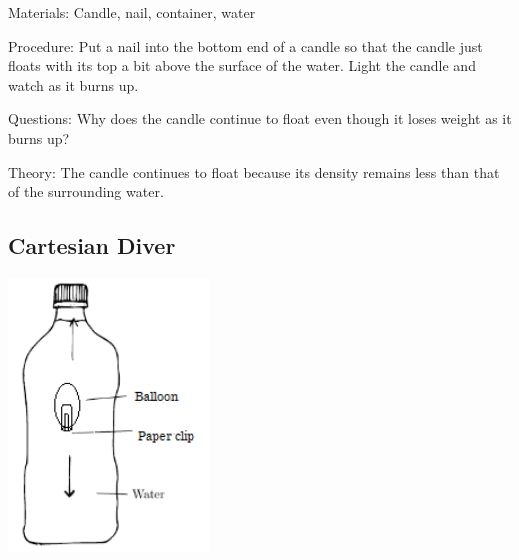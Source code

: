 \begin{multicols}{2}
\begin{description*}
\item[Materials:]{Candle, nail, container, water}
\item[Procedure:]{Put a nail into the bottom end of a candle so that the candle just floats with its top a bit above the surface of the water. Light the candle and watch as it burns up.}
\item[Questions:]{Why does the candle continue to float even though it loses weight as it burns up?}
\item[Theory:]{The candle continues to float because its density remains less than that of the surrounding water.}
\end{description*}

\vfill

\subsection{Cartesian Diver}

\begin{center}
\includegraphics[width=0.4\textwidth]{./img/cartesian-diver-2.png}
\end{center}


\end{multicols}
